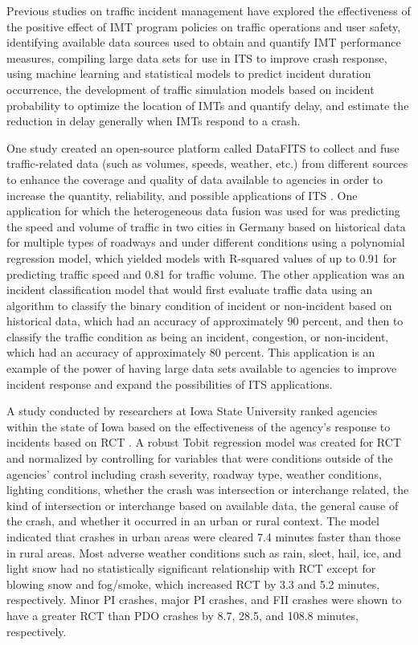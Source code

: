 \documentclass[
  letterpaper,
  authoryear]{elsarticle}
\begin{document}
Previous studies on traffic incident management have explored the
effectiveness of the positive effect of IMT program policies on traffic
operations and user safety, identifying available data sources used to
obtain and quantify IMT performance measures, compiling large data sets
for use in ITS to improve crash response, using machine learning and
statistical models to predict incident duration occurrence, the
development of traffic simulation models based on incident probability
to optimize the location of IMTs and quantify delay, and estimate the
reduction in delay generally when IMTs respond to a crash.

One study created an open-source platform called DataFITS to collect and
fuse traffic-related data (such as volumes, speeds, weather, etc.) from
different sources to enhance the coverage and quality of data available
to agencies in order to increase the quantity, reliability, and possible
applications of ITS \citep{zisner_datafits_2023}. One application for
which the heterogeneous data fusion was used for was predicting the
speed and volume of traffic in two cities in Germany based on historical
data for multiple types of roadways and under different conditions using
a polynomial regression model, which yielded models with R-squared
values of up to 0.91 for predicting traffic speed and 0.81 for traffic
volume. The other application was an incident classification model that
would first evaluate traffic data using an algorithm to classify the
binary condition of incident or non-incident based on historical data,
which had an accuracy of approximately 90 percent, and then to classify
the traffic condition as being an incident, congestion, or non-incident,
which had an accuracy of approximately 80 percent. This application is
an example of the power of having large data sets available to agencies
to improve incident response and expand the possibilities of ITS
applications.

A study conducted by researchers at Iowa State University ranked
agencies within the state of Iowa based on the effectiveness of the
agency's response to incidents based on RCT
\citep{mumtarin_traffic_2023}. A robust Tobit regression model was
created for RCT and normalized by controlling for variables that were
conditions outside of the agencies' control including crash severity,
roadway type, weather conditions, lighting conditions, whether the crash
was intersection or interchange related, the kind of intersection or
interchange based on available data, the general cause of the crash, and
whether it occurred in an urban or rural context. The model indicated
that crashes in urban areas were cleared 7.4 minutes faster than those
in rural areas. Most adverse weather conditions such as rain, sleet,
hail, ice, and light snow had no statistically significant relationship
with RCT except for blowing snow and fog/smoke, which increased RCT by
3.3 and 5.2 minutes, respectively. Minor PI crashes, major PI crashes,
and FII crashes were shown to have a greater RCT than PDO crashes by
8.7, 28.5, and 108.8 minutes, respectively.
\end{document}
